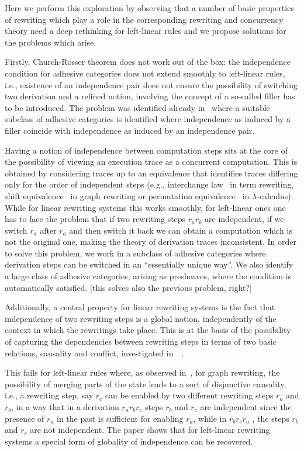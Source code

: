 Here we perform this exploration by observing that a number of basic
properties of rewriting which play a role in the corresponding
rewriting and concurrency theory need a deep rethinking for
left-linear rules and we propose solutions for the problems which
arise.

Firstly, Church-Rosser theorem does not work out of the box: the
independence condition for adhesive categories does not extend
smoothly to left-linear rules, i.e., existence of an independence pair
does not ensure the possibility of switching two derivation and a
refined notion, involving the concept of a so-called filler has to be
introduced. The problem was identified already
in~\cite{baldan2011adhesivity} where a suitable subclass of adhesive
categories is identified where independence as induced by a filler
coincide with independence as induced by an independence pair.

Having a notion of independence between computation steps sits at the core of the possibility of viewing an execution trace as a concurrent computation. This is obtained by considering traces up to an equivalence that identifies traces differing only for the order of independent steps (e.g., interchange law~\cite{Mes92} in term rewriting, shift
equivalence~\cite{CMREHL:AAGT} in graph rewriting or permutation
equivalence~\cite{JJL80} in $\lambda$-calculus). While for linear rewriting systems this works smoothly, for left-linear ones one has to face the problem that if two rewriting steps $r_a r_b$ are independent, if we switch $r_a$ after $r_a$ and then switch it back we can obtain a computation which is not the original one, making the theory of derivation traces inconsistent. In order to solve this problem, we work in a subclass of adhesive categories where derivation steps can be switched in an ``essentially unique way''. We also identify a large class of adhesive categories, arising as presheaves, where the condition is automatically satisfied. [this solves also the previous problem, right?]


Additionally, a central property for linear rewriting systems is the fact that independence of two rewriting steps is a global notion, independently of the context in which the rewritings take place. This is at the basis of the possibility of capturing the dependencies between rewriting steps in terms of two basic relations, causality and conflict, investigated in~~\cite{Handbook,Bal:PhD,Sch:RRSG}.

This fails for left-linear rules where, as observed
in~\cite{baldan2017domains}, for graph rewriting, the possibility of
merging parts of the state leads to a sort of disjunctive causality,
i.e., a rewriting step, say $r_c$ can be enabled by two different
rewriting steps $r_a$ and $r_b$, in a way that in a derivation
$r_a r_b r_c$ steps $r_b$ and $r_c$ are independent since the presence
of $r_a$ in the past is sufficient for enabling $r_a$, while in
$r_b r_c r_a$ , the steps $r_b$ and $r_c$ are not independent. The
paper shows that for left-linear rewriting systems a special form of
globality of independence can be recovered.


